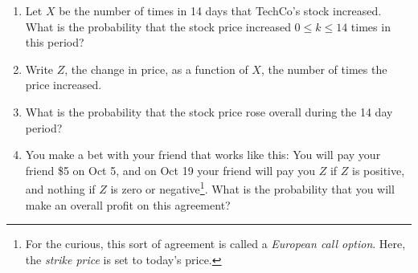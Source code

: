 \documentclass[11pt]{article}
\begin{document}
\begin{enumerate}
\begin{enumerate}
\item Let $X$ be the number of times in 14 days that TechCo's stock increased. What is the probability that the stock price increased $0 \leq k \leq 14$ times in this period?

\item Write $Z$, the change in price, as a function of $X$, the number of times the price increased.

\item What is the probability that the stock price rose overall during the 14 day period?

\item You make a bet with your friend that works like this: You will pay your friend \$5 on Oct 5, and on Oct 19 your friend will pay you $Z$ if $Z$ is positive, and nothing if $Z$ is zero or negative\footnote{For the curious, this sort of agreement is called a \emph{European call option}. Here, the \emph{strike price} is set to today's price.}. What is the probability that you will make an overall profit on this agreement?
\end{enumerate}
\end{enumerate}
\end{document}
